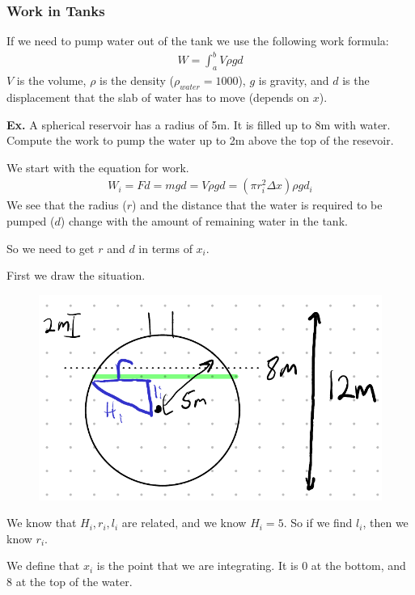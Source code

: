 \documentclass[12pt,letterpaper]{article} \usepackage{amsmath} \usepackage{graphicx}  \usepackage{longtable}  \usepackage{amssymb}
\begin{document}
            \subsubsection{Work in Tanks}
            If we need to pump water out of the tank we use the following work formula:
            \begin{align*}
                W = \int_a^b V\rho gd
            \end{align*}
            $V$ is the volume, $\rho$ is the density ($\rho_{water} = 1000$), $g$ is gravity, and $d$ is the displacement that the slab of water has to move (depends on $x$).

            \begin{mdframed}
                \textbf{Ex. } A spherical reservoir has a radius of 5m. It is filled up to 8m with water. Compute  the work to pump the water up to 2m above the top of the resevoir. 

                We start with the equation for work.
                \begin{align*}
                    W_i = Fd = mgd = V\rho gd = (\pi r_i^2\Delta x)\rho gd_i
                \end{align*}
                We see that the radius ($r$) and the distance that the water is required to be pumped ($d$) change with the amount of remaining water in the tank.

                So we need to get $r$ and $d$ in terms of $x_i$. 

                First we draw the situation. 

                \begin{figure}[H]
                    \centering
                    \includegraphics[width=0.4\linewidth]{ex5.png}
                \end{figure}

                We know that $H_i, r_i, l_i$ are related, and we know $H_i = 5$. So if we find $l_i$, then we know $r_i$. 

                We define that $x_i$ is the point that we are integrating. It is 0 at the bottom, and 8 at the top of the water. 


\end{mdframed}
\end{document}
